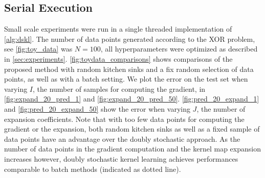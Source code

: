\documentclass{article} %
\begin{document}
\subsection{Serial Execution}\label{sec:single_host}
Small scale experiments were run in a single threaded implementation of \autoref{alg:dskl}. The number of data points generated according to the XOR problem, see \autoref{fig:toy_data} was $N=100$, all hyperparameters were optimized as described in \autoref{sec:experiments}.
%
\autoref{fig:toydata_comparisons} shows comparisons of the proposed method with random kitchen sinks and a fix random selection of data points, as well as with a batch setting. 
We plot the error on the test set when varying $I$, the number of samples for computing the gradient, in \autoref{fig:expand_20_pred_1} and \autoref{fig:expand_20_pred_50}. \autoref{fig:pred_20_expand_1} and \autoref{fig:pred_20_expand_50} show the error when varying $J$, the number of expansion coefficients. Note that with too few data points for computing the gradient or the expansion, both random kitchen sinks as well as a fixed sample of data points have an advantage over the doubly stochastic approach. As the number of data points in the gradient computation and the kernel map expansion increases however, doubly stochastic kernel learning achieves performances comparable to batch methods (indicated as dotted line).
%
\end{document}

